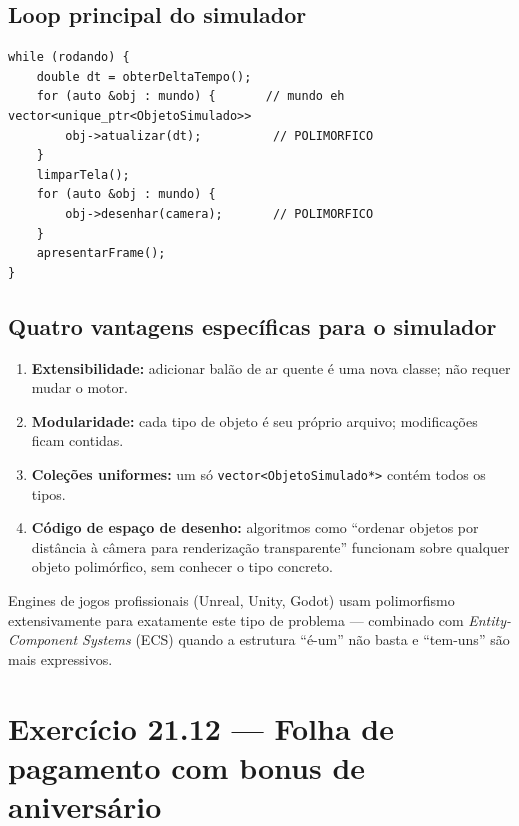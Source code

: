\documentclass[11pt,a4paper]{article}
\begin{document}
\subsection*{Loop principal do simulador}

\begin{lstlisting}[style=cppcode,numbers=none]
while (rodando) {
    double dt = obterDeltaTempo();
    for (auto &obj : mundo) {       // mundo eh vector<unique_ptr<ObjetoSimulado>>
        obj->atualizar(dt);          // POLIMORFICO
    }
    limparTela();
    for (auto &obj : mundo) {
        obj->desenhar(camera);       // POLIMORFICO
    }
    apresentarFrame();
}
\end{lstlisting}

\subsection*{Quatro vantagens espec\'ificas para o simulador}

\begin{enumerate}[leftmargin=*,itemsep=0pt]
  \item \textbf{Extensibilidade:} adicionar bal\~ao de ar quente \'e uma nova classe; n\~ao requer mudar o motor.
  \item \textbf{Modularidade:} cada tipo de objeto \'e seu pr\'oprio arquivo; modifica\c{c}\~oes ficam contidas.
  \item \textbf{Cole\c{c}\~oes uniformes:} um s\'o \texttt{vector<ObjetoSimulado*>} cont\'em todos os tipos.
  \item \textbf{C\'odigo de espa\c{c}o de desenho:} algoritmos como ``ordenar objetos por dist\^ancia \`a c\^amera para renderiza\c{c}\~ao transparente'' funcionam sobre qualquer objeto polim\'orfico, sem conhecer o tipo concreto.
\end{enumerate}

\begin{obseng}
Engines de jogos profissionais (Unreal, Unity, Godot) usam polimorfismo extensivamente para exatamente este tipo de problema --- combinado com \emph{Entity-Component Systems} (ECS) quando a estrutura ``\'e-um'' n\~ao basta e ``tem-uns'' s\~ao mais expressivos.
\end{obseng}

\newpage
\section{Exerc\'icio 21.12 --- Folha de pagamento com bonus de anivers\'ario}
\end{document}
